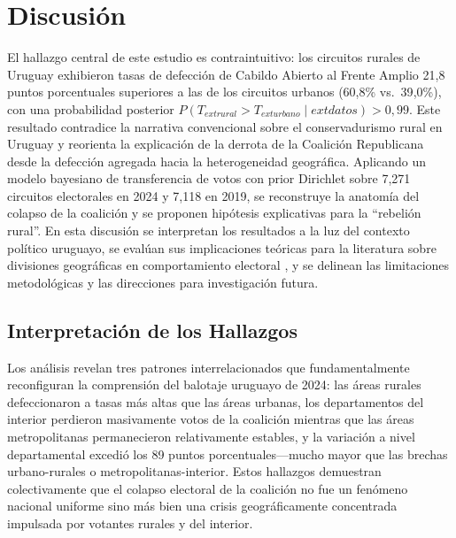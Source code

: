 
\section{Discusión}
\label{sec:discusion}

El hallazgo central de este estudio es contraintuitivo: los circuitos rurales de Uruguay exhibieron tasas de defección de Cabildo Abierto al Frente Amplio 21{,}8 puntos porcentuales superiores a las de los circuitos urbanos (60{,}8\% vs.\ 39{,}0\%), con una probabilidad posterior $P(T_{	ext{rural}} > T_{	ext{urbano}} \mid 	ext{datos}) > 0{,}99$. Este resultado contradice la narrativa convencional sobre el conservadurismo rural en Uruguay \citep{gonzalez1991electoral, rodden2019s} y reorienta la explicación de la derrota de la Coalición Republicana desde la defección agregada hacia la heterogeneidad geográfica. Aplicando un modelo bayesiano de transferencia de votos con prior Dirichlet sobre 7{,}271 circuitos electorales en 2024 y 7{,}118 en 2019, se reconstruye la anatomía del colapso de la coalición y se proponen hipótesis explicativas para la ``rebelión rural''. En esta discusión se interpretan los resultados a la luz del contexto político uruguayo, se evalúan sus implicaciones teóricas para la literatura sobre divisiones geográficas en comportamiento electoral \citep{calvo2003local, luna2014segmented}, y se delinean las limitaciones metodológicas y las direcciones para investigación futura.

\subsection{Interpretación de los Hallazgos}
\label{sec:discusion_interpretacion}

Los análisis revelan tres patrones interrelacionados que fundamentalmente reconfiguran la comprensión del balotaje uruguayo de 2024: las áreas rurales defeccionaron a tasas más altas que las áreas urbanas, los departamentos del interior perdieron masivamente votos de la coalición mientras que las áreas metropolitanas permanecieron relativamente estables, y la variación a nivel departamental excedió los 89 puntos porcentuales---mucho mayor que las brechas urbano-rurales o metropolitanas-interior. Estos hallazgos demuestran colectivamente que el colapso electoral de la coalición no fue un fenómeno nacional uniforme sino más bien una crisis geográficamente concentrada impulsada por votantes rurales y del interior.

